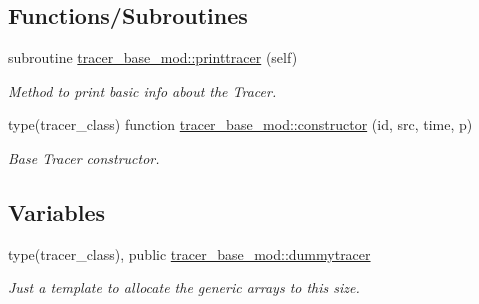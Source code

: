\subsection*{Functions/\+Subroutines}
\begin{DoxyCompactItemize}
\item 
subroutine \mbox{\hyperlink{namespacetracer__base__mod_a947559c248d9ddb1337721b71448167b}{tracer\+\_\+base\+\_\+mod\+::printtracer}} (self)
\begin{DoxyCompactList}\small\item\em Method to print basic info about the Tracer. \end{DoxyCompactList}\item 
type(tracer\+\_\+class) function \mbox{\hyperlink{namespacetracer__base__mod_ab1e40296d34ae434e792768d1b77859f}{tracer\+\_\+base\+\_\+mod\+::constructor}} (id, src, time, p)
\begin{DoxyCompactList}\small\item\em Base Tracer constructor. \end{DoxyCompactList}\end{DoxyCompactItemize}
\subsection*{Variables}
\begin{DoxyCompactItemize}
\item 
type(tracer\+\_\+class), public \mbox{\hyperlink{namespacetracer__base__mod_a6e04d44b4ef46cf27fb0e38290a98c14}{tracer\+\_\+base\+\_\+mod\+::dummytracer}}
\begin{DoxyCompactList}\small\item\em Just a template to allocate the generic arrays to this size. \end{DoxyCompactList}\end{DoxyCompactItemize}
